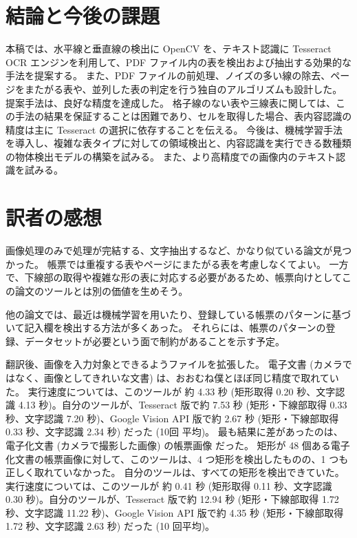 \documentclass[uplatex, twocolumn,10pt]{jsarticle}
\begin{document}
\section{結論と今後の課題}
本稿では、水平線と垂直線の検出に OpenCV を、テキスト認識に Tesseract OCR エンジンを利用して、PDF ファイル内の表を検出および抽出する効果的な手法を提案する。
また、PDF ファイルの前処理、ノイズの多い線の除去、ページをまたがる表や、並列した表の判定を行う独自のアルゴリズムも設計した。
提案手法は、良好な精度を達成した。
格子線のない表や三線表に関しては、この手法の結果を保証することは困難であり、セルを取得した場合、表内容認識の精度は主に Tesseract の選択に依存することを伝える。
今後は、機械学習手法を導入し、複雑な表タイプに対しての領域検出と、内容認識を実行できる数種類の物体検出モデルの構築を試みる。
また、より高精度での画像内のテキスト認識を試みる。






\section{訳者の感想}
画像処理のみで処理が完結する、文字抽出するなど、かなり似ている論文が見つかった。
帳票では重複する表やページにまたがる表を考慮しなくてよい。
一方で、下線部の取得や複雑な形の表に対応する必要があるため、帳票向けとしてこの論文のツールとは別の価値を生めそう。

他の論文では、最近は機械学習を用いたり、登録している帳票のパターンに基づいて記入欄を検出する方法が多くあった。
それらには、帳票のパターンの登録、データセットが必要という面で制約があることを示す予定。

翻訳後、画像を入力対象とできるようファイルを拡張した。
電子文書 (カメラではなく、画像としてきれいな文書) は、おおむね僕とほぼ同じ精度で取れていた。
実行速度については、このツールが 約 4.33 秒 (矩形取得 0.20 秒、文字認識 4.13 秒)。自分のツールが、Tesseract 版で約 7.53 秒 (矩形・下線部取得 0.33 秒、文字認識 7.20 秒)、Google Vision API 版で約 2.67 秒 (矩形・下線部取得 0.33 秒、文字認識 2.34 秒) だった (10回 平均)。
最も結果に差があったのは、電子化文書 (カメラで撮影した画像) の帳票画像 だった。
矩形が 48 個ある電子化文書の帳票画像に対して、このツールは、4 つ矩形を検出したものの、1 つも正しく取れていなかった。
自分のツールは、すべての矩形を検出できていた。
実行速度については、このツールが 約 0.41 秒 (矩形取得 0.11 秒、文字認識 0.30 秒)。自分のツールが、Tesseract 版で約 12.94 秒 (矩形・下線部取得 1.72 秒、文字認識 11.22 秒)、Google Vision API 版で約 4.35 秒 (矩形・下線部取得 1.72 秒、文字認識 2.63 秒) だった (10 回平均)。
\end{document}
